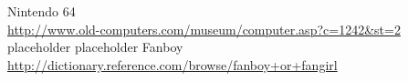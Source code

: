 \begin{thebibliography}{1} %
	Nintendo 64\\\url{http://www.old-computers.com/museum/computer.asp?c=1242&st=2}
	placeholder
	placeholder
	Fanboy\\\url{http://dictionary.reference.com/browse/fanboy+or+fangirl}
\end{thebibliography}
